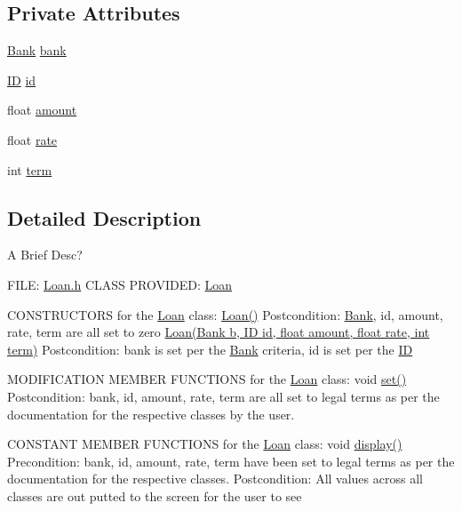 \subsection*{Private Attributes}
\begin{DoxyCompactItemize}
\item 
\hyperlink{classBank}{Bank} \hyperlink{classLoan_aa9d146c85226c7cd21d4963b1e826d69}{bank}
\item 
\hyperlink{classID}{I\+D} \hyperlink{classLoan_a77036ebdfea09fa00f2e6c5e1c7ee3c5}{id}
\item 
float \hyperlink{classLoan_a1cdd7876daa9a78ab7ac76cfdd17429e}{amount}
\item 
float \hyperlink{classLoan_a9b41857ab5a2bcc22bb877c14565071b}{rate}
\item 
int \hyperlink{classLoan_a9a132d11ff7a8126a1d7b556d03a4ea9}{term}
\end{DoxyCompactItemize}


\subsection{Detailed Description}
A Brief Desc? 

F\+I\+L\+E\+: \hyperlink{Loan_8h}{Loan.\+h} C\+L\+A\+S\+S P\+R\+O\+V\+I\+D\+E\+D\+: \hyperlink{classLoan}{Loan}

C\+O\+N\+S\+T\+R\+U\+C\+T\+O\+R\+S for the \hyperlink{classLoan}{Loan} class\+: \hyperlink{classLoan_ac9837063879d5a4d21f288bdd5db6013}{Loan()} Postcondition\+: \hyperlink{classBank}{Bank}, id, amount, rate, term are all set to zero \hyperlink{classLoan_aefae6841fb1990b946ca473ff6a1ef8c}{Loan(\+Bank b, I\+D id, float amount, float rate, int term)} Postcondition\+: bank is set per the \hyperlink{classBank}{Bank} criteria, id is set per the \hyperlink{classID}{I\+D}

M\+O\+D\+I\+F\+I\+C\+A\+T\+I\+O\+N M\+E\+M\+B\+E\+R F\+U\+N\+C\+T\+I\+O\+N\+S for the \hyperlink{classLoan}{Loan} class\+: void \hyperlink{classLoan_a0536fb4faa0670d69afa6adf97ef161c}{set()} Postcondition\+: bank, id, amount, rate, term are all set to legal terms as per the documentation for the respective classes by the user.

C\+O\+N\+S\+T\+A\+N\+T M\+E\+M\+B\+E\+R F\+U\+N\+C\+T\+I\+O\+N\+S for the \hyperlink{classLoan}{Loan} class\+: void \hyperlink{classLoan_a271b5df7e102eb82cb43c76029301fae}{display()} Precondition\+: bank, id, amount, rate, term have been set to legal terms as per the documentation for the respective classes. Postcondition\+: All values across all classes are out putted to the screen for the user to see

